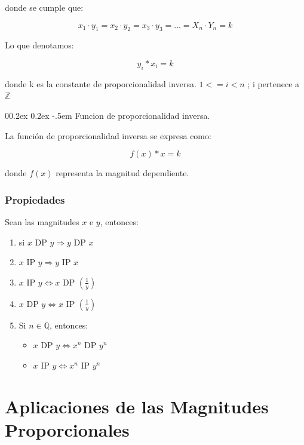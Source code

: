 \documentclass[
  stu,
  floatsintext,
  longtable,
  a4paper,
  nolmodern,
  notxfonts,
  notimes,
  colorlinks=true,linkcolor=blue,citecolor=blue,urlcolor=blue]{apa7}
\makeatletter
\renewcommand{\paragraph}{\@startsection{paragraph}{4}{\parindent}%
	{0\baselineskip \@plus 0.2ex \@minus 0.2ex}%
	{-.5em}%
	{\normalfont\normalsize\bfseries\typesectitle}}
\makeatother
\begin{document}
donde se cumple que:

\[
x_1 \cdot y_1 = x_2 \cdot y_2 = x_3 \cdot y_3 = ... = X_n \cdot Y_n = k
\]

Lo que denotamos:

\[
y_i * x_i = k
\]

donde k es la constante de proporcionalidad inversa. \(1 <= i < n\) ; i
pertenece a \(\mathbb{Z}\)

\paragraph{Funcion de proporcionalidad
inversa.}\label{funcion-de-proporcionalidad-inversa}

La función de proporcionalidad inversa se expresa como:

\[
f(x) * x = k
\]

donde \(f(x)\) representa la magnitud dependiente.

\subsubsection{Propiedades}\label{propiedades}

Sean las magnitudes \(x\) e \(y\), entonces:

\begin{enumerate}
\item si $ x \text{ DP } y \Rightarrow y \text{ DP } x $
    \item $ x \text{ IP } y \Rightarrow y \text{ IP } x$
\item $ x \text{ IP } y \Leftrightarrow x \text{ DP } \left( \frac{1}{y} \right) $
\item $ x \text{ DP } y \Leftrightarrow x \text{ IP } \left( \frac{1}{y} \right) $
\item Si $ n \in \mathbb{Q} $, entonces:
\begin{itemize}
\item $ x \text{ DP } y \Leftrightarrow x^n \text{ DP } y^n $
\item $ x \text{ IP } y \Leftrightarrow x^n \text{ IP } y^n $
\end{itemize}
\end{enumerate}

\section{Aplicaciones de las Magnitudes
Proporcionales}\label{aplicaciones-de-las-magnitudes-proporcionales}
\end{document}
